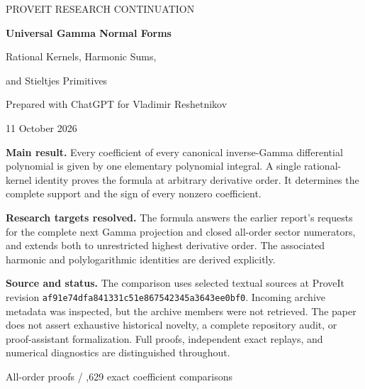 \documentclass[11pt,letterpaper]{article}
\numberwithin{equation}{section}
\theoremstyle{plain}
\theoremstyle{definition}
\theoremstyle{remark}
\newcommand{\sourcecommit}{af91e74dfa841331c51e867542345a3643ee0bf0}
\begin{document}
\hypersetup{pageanchor=false}
\begin{titlepage}
\centering
\vspace*{0.7cm}
{\sffamily\color{accent}\Large PROVEIT RESEARCH CONTINUATION\par}
\vspace{1.0cm}
{\color{ink}\LARGE\bfseries Universal Gamma Normal Forms\par}
\vspace{0.4cm}
{\color{ink}\Large Rational Kernels, Harmonic Sums,\par and Stieltjes Primitives\par}
\vspace{0.9cm}
{\large Prepared with ChatGPT for Vladimir Reshetnikov\par}
\vspace{0.3cm}
{11 October 2026\par}
\vspace{1.0cm}
\begin{minipage}{0.92\textwidth}
\small
\textbf{Main result.} Every coefficient of every canonical inverse-Gamma differential polynomial is given by one elementary polynomial integral. A single rational-kernel identity proves the formula at arbitrary derivative order. It determines the complete support and the sign of every nonzero coefficient.

\medskip
\textbf{Research targets resolved.} The formula answers the earlier report's requests for the complete next Gamma projection and closed all-order sector numerators, and extends both to unrestricted highest derivative order. The associated harmonic and polylogarithmic identities are derived explicitly.

\medskip
\textbf{Source and status.} The comparison uses selected textual sources at ProveIt revision \texttt{\sourcecommit}. Incoming archive metadata was inspected, but the archive members were not retrieved. The paper does not assert exhaustive historical novelty, a complete repository audit, or proof-assistant formalization. Full proofs, independent exact replays, and numerical diagnostics are distinguished throughout.
\end{minipage}
\vfill
{\small\sffamily All-order proofs \enspace / ,629 exact coefficient comparisons\par}
\end{titlepage}
\hypersetup{pageanchor=true}
\end{document}
